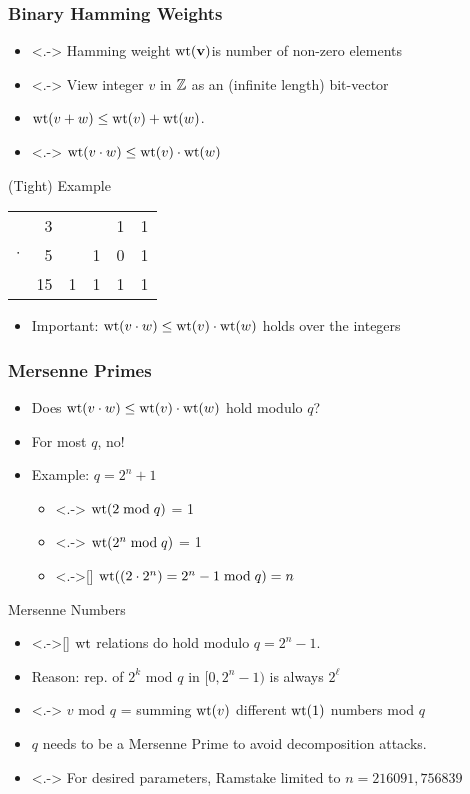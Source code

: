 \documentclass[11pt,t,xcolor=pdftex,svgnames]{beamer}
\begin{document}
\begin{frame}    
    \frametitle{Binary Hamming Weights}
\begin{itemize}
\item<.-> Hamming weight $\operatorname*{wt}(\mathbf{v})$is number of non-zero
  elements
\smallskip
\item<.-> View integer $v$ in $\mathbb{Z}$ as an (infinite length) bit-vector
\smallskip
\item<+-> $\operatorname*{wt}(v + w) \leq \operatorname*{wt}(v)+\operatorname*{wt}(w)$.
\smallskip
\item<.-> $\operatorname*{wt}(v \cdot w ) \leq \operatorname*{wt}(v) \cdot \operatorname*{wt}(w)$
\end{itemize}
\onslide<+->
\begin{block}{(Tight) Example}
\begin{table}
\begin{tabular}{cr|cccc}
&3&&&1&1\\
$\cdot$&5&&1&0&1\\
\hline
&15&1&1&1&1\\
\end{tabular}
\end{table}
\end{block}
\begin{itemize}
\item<+-> Important: $\operatorname*{wt}(v \cdot w ) \leq \operatorname*{wt}(v) \cdot
  \operatorname*{wt}(w)$ holds \alert{over the integers}
\end{itemize}
\end{frame}
\begin{frame}
  \frametitle{Mersenne Primes}
\begin{itemize}
\item<+-> Does $\operatorname*{wt}(v \cdot w) \leq \operatorname*{wt}(v) \cdot \operatorname*{wt}(w)$ hold modulo $q$?
\item<+->[\RedCross] For most $q$, no!
\item<+-> Example: $q=2^{n}+1$
\begin{itemize}
\item<.-> $\operatorname*{wt}(2 \bmod{q})$ = 1
\item<.-> $\operatorname*{wt}(2^{n} \bmod{q})$ = 1
\item<.->[\RedCross] $\operatorname*{wt}((2\cdot 2^{n}) = 2^{n}-1 \bmod{q})=n$ 
\end{itemize}
\end{itemize} 
\onslide<+->
\begin{block}{Mersenne Numbers}
\begin{itemize}
\item<.->[\GreenCheck] $\operatorname*{wt}$ relations do hold modulo $q=2^{n}-1$. 
\item<+-> Reason: rep. of $2^{k}$ mod $q$  in $[0,2^{n}-1)$ is always
$2^{\ell}$
\item<.-> $v$ mod $q$ = summing $\operatorname*{wt}(v)$ different $\operatorname*{wt}(1)$
  numbers mod $q$
\item<+->  $q$ needs to be a \alert{Mersenne Prime} to avoid
  decomposition attacks.
\item[\RedCross]<.-> For desired parameters, Ramstake limited to $n=216091,756839$
\end{itemize}
\end{block}
\end{frame}
\end{document}
